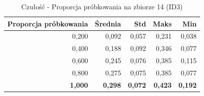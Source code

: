 \begin{table}[htbp]
\centering
\small
\setlength{\tabcolsep}{6pt}
\renewcommand{\arraystretch}{1.2}
\caption{Czułość - Proporcja próbkowania na zbiorze 14 (ID3)}
\label{tab:ID3_sample_ratio_14_recall}
\begin{tabular}{r|r|r|r|r}
\toprule
Proporcja próbkowania & Średnia & Std & Maks & Min \\
\hline
0,200 & 0,092 & 0,057 & 0,231 & 0,038 \\
0,400 & 0,188 & 0,092 & 0,346 & 0,077 \\
0,600 & 0,245 & 0,076 & 0,385 & 0,115 \\
0,800 & 0,275 & 0,075 & 0,385 & 0,077 \\
\textbf{1,000} & \textbf{0,298} & \textbf{0,072} & \textbf{0,423} & \textbf{0,192} \\
\bottomrule
\end{tabular}
\end{table}